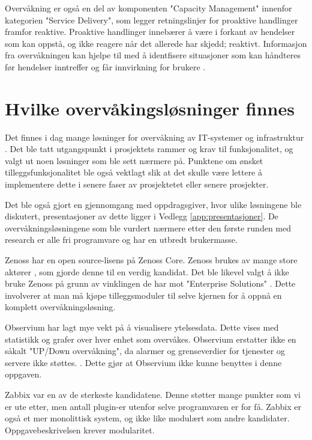 Overvåkning er også en del av komponenten "Capacity Management" innenfor kategorien "Service Delivery", som legger retningslinjer for proaktive handlinger framfor reaktive. Proaktive handlinger innebærer å være i forkant av hendelser som kan oppstå, og ikke reagere når det allerede har skjedd; reaktivt. Informasjon fra overvåkningen kan hjelpe til med å identfisere situasjoner som kan håndteres før hendelser inntreffer og får innvirkning for brukere \cite{itil1} \cite{itil2} \cite{events}.

\section{Hvilke overvåkingsløsninger finnes}
Det finnes i dag mange løsninger for overvåkning av IT-systemer og infrastruktur \cite{wiki:networkmonitoring}. Det ble tatt utgangspunkt i prosjektets rammer og krav til funksjonalitet, og valgt ut noen løsninger som ble sett nærmere på. Punktene om ønsket tilleggsfunksjonalitet ble også vektlagt slik at det skulle være lettere å implementere dette i senere faser av prosjektetet eller senere prosjekter. 

Det ble også gjort en gjennomgang med oppdragsgiver, hvor ulike løsningene ble diskutert, presentasjoner av dette ligger i Vedlegg \ref{app:presentasjoner}. De overvåkningsløsningene som ble vurdert nærmere etter den første runden med research er alle fri programvare og har en utbredt brukermasse. 

Zenoss har en open source-lisens på Zenoss Core. Zenoss brukes av mange store aktører \cite{zenoss}, som gjorde denne til en verdig kandidat. Det ble likevel valgt å ikke bruke Zenoss på grunn av vinklingen de har mot "Enterprise Solutions" \cite{zenpacks}. Dette involverer at man må kjøpe tilleggsmoduler til selve kjernen for å oppnå en komplett overvåkningsløsning.

Observium har lagt mye vekt på å visualisere ytelsesdata. Dette vises med statistikk og grafer over hver enhet som overvåkes. Observium erstatter ikke en såkalt "UP/Down overvåkning", da alarmer og grenseverdier for tjenester og servere ikke støttes. \cite{observium}. Dette gjør at Observium ikke kunne benyttes i denne oppgaven.

Zabbix \cite{zabbix} var en av de sterkeste kandidatene. Denne støtter mange punkter som vi er ute etter, men antall plugin-er utenfor selve programvaren er for få. Zabbix er også et mer monolittisk system, og ikke like modulært som andre kandidater\cite{zabbixandnagios}. Oppgavebeskrivelsen krever modularitet. 

